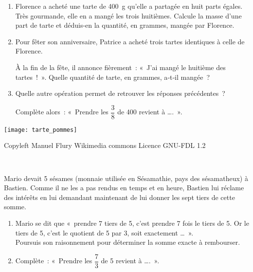 \begin{activite}

\begin{minipage}[c]{0.7\linewidth}
\begin{partie}
\begin{enumerate}
 \item Florence a acheté une tarte de 400 g qu'elle a partagée en huit parts égales. Très gourmande, elle en a mangé les trois huitièmes. Calcule la masse d'une part de tarte et déduis-en la quantité, en grammes, mangée par Florence.
 \item Pour fêter son anniversaire, Patrice a acheté trois tartes identiques à celle de Florence.
 
À la fin de la fête, il annonce fièrement : « J'ai mangé le huitième des tartes ! ». Quelle quantité de tarte, en grammes, a‑t‑il mangée ?
 \item Quelle autre opération permet de retrouver les réponses précédentes ?
 
Complète alors : « Prendre les $\dfrac{3}{8}$ de 400 revient à \ldots . ».
 \end{enumerate}
\end{partie}
\end{minipage} \hfill%
\begin{minipage}[c]{0.27\linewidth}
\begin{center} \texttt{[image: tarte\_pommes]} \end{center}
\begin{center} \quad \small{Copyleft Manuel Flury \newline \phantom{...} Wikimedia commons \newline \phantom{..} Licence GNU-FDL 1.2} \end{center}
\end{minipage} \\

\begin{partie}
Mario devait 5 sésames (monnaie utilisée en Sésamathie, pays des sésamatheux) à Bastien. 
Comme il ne les a pas rendus en temps et en heure, Bastien lui réclame des intérêts en lui demandant maintenant de lui donner les sept tiers de cette somme.
\begin{enumerate}
 \item Mario se dit que « prendre 7 tiers de 5, c'est prendre 7 fois le tiers de 5. Or le tiers de 5, c'est le quotient de 5 par 3, soit exactement \ldots ». \\[0.5em]
Poursuis son raisonnement pour déterminer la somme exacte à rembourser.
 \item Complète : « Prendre les $\dfrac{7}{3}$ de 5 revient à \ldots . ».
 \end{enumerate}
\end{partie}

\end{activite}

